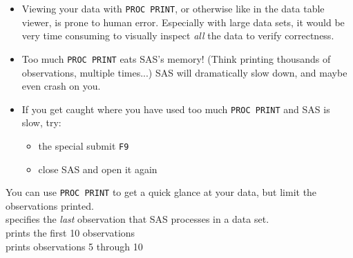 \begin{frame}
\begin{itemize}
\item Viewing your data with \texttt{PROC PRINT}, or otherwise like in the data table viewer, is prone to human error.  Especially with large data sets, it would be very time consuming to visually inspect \emph{all} the data to verify correctness.
\item Too much \texttt{PROC PRINT} eats SAS's memory!  (Think printing thousands of observations, multiple times...) SAS will dramatically slow down, and maybe even crash on you.
\item If you get caught where you have used too much \texttt{PROC PRINT} and SAS is slow, try:
\begin{itemize}
\item the special submit \texttt{F9}
\item close SAS and open it again
\end{itemize}
\end{itemize}
\end{frame}

\begin{frame}
You can use \texttt{PROC PRINT} to get a quick glance at your data, but limit the observations printed.
\vskip15pt
 \\
\vskip3pt
specifies the \emph{last} observation that SAS processes in a data set.
\vskip15pt
\\
\vskip3pt
prints the first 10 observations
\vskip15pt
\\
\vskip3pt
prints observations 5 through 10
\end{frame}

